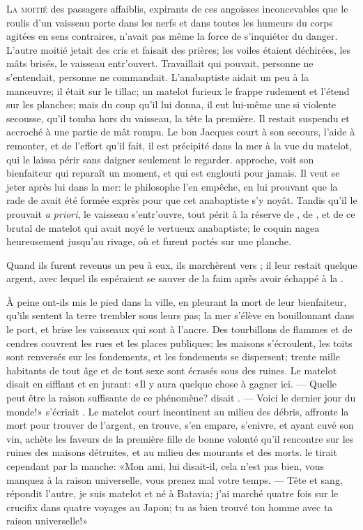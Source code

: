 \lettrine[findent=-3pt,nindent=0.6em]{L}{a moitié} 
des passagers affaiblis, expirants de ces angoisses 
inconcevables que le roulis d’un vaisseau porte dans les nerfs et dans
toutes les humeurs du corps agitées en sens contraires, n’avait pas
même la force de s’inquiéter du danger. L’autre moitié jetait des cris
et faisait des prières; les voiles étaient déchirées, les mâts brisés,
le vaisseau entr’ouvert. Travaillait qui pouvait, personne ne
s’entendait, personne ne commandait. L’anabaptiste aidait un peu à la
manœuvre; il était sur le tillac; un matelot furieux le frappe
rudement et l’étend sur les planches; mais du coup qu’il lui donna, il
eut lui-même une si violente secousse, qu’il tomba hors du vaisseau, la
tête la première. Il restait suspendu et accroché à une partie de mât
rompu. Le bon Jacques court à son secours, l’aide à remonter, et de
l’effort qu’il fait, il est précipité dans la mer à la vue du matelot,
qui le laissa périr sans daigner seulement le regarder. 
approche, voit son bienfaiteur qui reparaît un moment, et qui est
englouti pour jamais. Il veut se jeter après lui dans la mer: le
philosophe  l’en empêche, en lui prouvant que la rade de
 avait été formée exprès pour que cet anabaptiste s’y noyât.
Tandis qu’il le prouvait \textit{a priori}, le vaisseau s’entr’ouvre, tout
périt à la réserve de , de , et de ce brutal de 
matelot
qui avait noyé le vertueux anabaptiste; le coquin nagea heureusement
jusqu’au rivage, où  et  furent portés sur une planche.

Quand ils furent revenus un peu à eux, ils marchèrent vers ; il
leur restait quelque argent, avec lequel ils espéraient se sauver de la
faim après avoir échappé à la .


À peine ont-ils mis le pied dans la ville, en pleurant la mort de leur
bienfaiteur, qu’ils sentent la terre trembler sous leurs pas; la mer
s’élève en bouillonnant dans le port, et brise les vaisseaux qui sont à
l’ancre. Des tourbillons de flammes et de cendres couvrent les rues et
les places publiques; les maisons s’écroulent, les toits sont renversés
sur les fondements, et les fondements se dispersent; trente mille
habitants de tout âge et de tout sexe sont écrasés sous des ruines. Le
matelot disait en sifflant et en jurant: «Il y aura quelque chose à
gagner ici. — Quelle peut être la raison suffisante de ce phénomène?
disait . — Voici le dernier jour du monde!» s’écriait . Le matelot court incontinent au milieu des débris, affronte la mort pour
trouver de l’argent, en trouve, s’en empare, s’enivre, et ayant cuvé
son vin, achète les faveurs de la première fille de bonne volonté qu’il
rencontre sur les ruines des maisons détruites, et au milieu des
mourants et des morts.  le tirait cependant par la manche: «Mon
ami, lui disait-il, cela n’est pas bien, vous manquez à la raison
universelle, vous prenez mal votre temps. — Tête et sang, répondit
l’autre, je suis matelot et né à Batavia; j’ai marché quatre fois sur
le crucifix dans quatre voyages au Japon; tu as bien trouvé ton
homme avec ta \linebreak raison universelle!»


